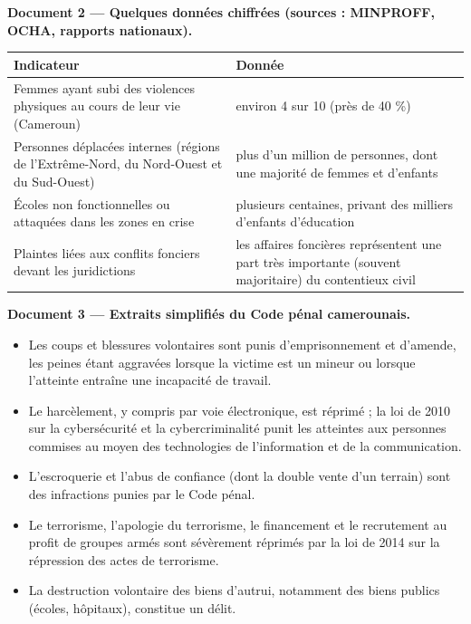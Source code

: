 \documentclass[11pt]{article}
\begin{document}
\textbf{Document 2 — Quelques données chiffrées (sources : MINPROFF, OCHA, rapports nationaux).}\par

\begin{center}
\begin{tabularx}{\linewidth}{|l|X|}
\hline
\rowcolor{popblueL} \textbf{Indicateur} & \textbf{Donnée} \\
\hline
Femmes ayant subi des violences physiques au cours de leur vie (Cameroun) & environ 4 sur 10 (près de 40 \%) \\
\hline
Personnes déplacées internes (régions de l'Extrême-Nord, du Nord-Ouest et du Sud-Ouest) & plus d'un million de personnes, dont une majorité de femmes et d'enfants \\
\hline
Écoles non fonctionnelles ou attaquées dans les zones en crise & plusieurs centaines, privant des milliers d'enfants d'éducation \\
\hline
Plaintes liées aux conflits fonciers devant les juridictions & les affaires foncières représentent une part très importante (souvent majoritaire) du contentieux civil \\
\hline
\end{tabularx}
\end{center}

\textbf{Document 3 — Extraits simplifiés du Code pénal camerounais.}\par

\begin{itemize}
\item Les coups et blessures volontaires sont punis d'emprisonnement et d'amende, les peines étant aggravées lorsque la victime est un mineur ou lorsque l'atteinte entraîne une incapacité de travail.
\item Le harcèlement, y compris par voie électronique, est réprimé ; la loi de 2010 sur la cybersécurité et la cybercriminalité punit les atteintes aux personnes commises au moyen des technologies de l'information et de la communication.
\item L'escroquerie et l'abus de confiance (dont la double vente d'un terrain) sont des infractions punies par le Code pénal.
\item Le terrorisme, l'apologie du terrorisme, le financement et le recrutement au profit de groupes armés sont sévèrement réprimés par la loi de 2014 sur la répression des actes de terrorisme.
\item La destruction volontaire des biens d'autrui, notamment des biens publics (écoles, hôpitaux), constitue un délit.
\end{itemize}
\end{document}

